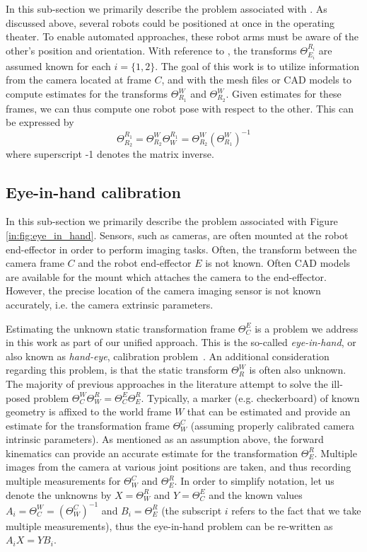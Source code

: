 In this sub-section we primarily describe the problem associated with .
As discussed above, several robots could be positioned at once in the operating theater.
To enable automated approaches, these robot arms must be aware of the other's position and orientation.
With reference to , the transforms $\Theta^{R_i}_{E_i}$ are assumed known for each $i=\{1, 2\}$.
The goal of this work is to utilize information from the camera located at frame $C$, and with the mesh files or CAD models to compute estimates for the transforms $\Theta^W_{R_1}$ and $\Theta^W_{R_2}$.
Given estimates for these frames, we can thus compute one robot pose with respect to the other.
This can be expressed by
\[
\Theta^{R_1}_{R_2} = \Theta^W_{R_2} \Theta^{R_1}_W = \Theta^W_{R_2} (\Theta^W_{R_1})^{-1}
\]
where superscript -1 denotes the matrix inverse. 

\subsection{Eye-in-hand calibration}

In this sub-section we primarily describe the problem associated with Figure \ref{in:fig:eye_in_hand}.
Sensors, such as cameras, are often mounted at the robot end-effector in order to perform imaging tasks.
Often, the transform between the camera frame $C$ and the robot end-effector $E$ is not known.
Often CAD models are available for the mount which attaches the camera to the end-effector.
However, the precise location of the camera imaging sensor is not known accurately, i.e. the camera extrinsic parameters.

Estimating the unknown static transformation frame $\Theta^E_C$ is a problem we address in this work as part of our unified approach.
This is the so-called \textit{eye-in-hand}, or also known as \textit{hand-eye}, calibration problem~\cite{Horaud95}.
An additional consideration regarding this problem, is that the static transform $\Theta^W_R$ is often also unknown.
The majority of previous approaches in the literature attempt to solve the ill-posed problem $\Theta^W_C \Theta^R_W = \Theta^E_C \Theta^R_E$.
Typically, a marker (e.g. checkerboard) of known geometry is affixed to the world frame $W$ that can be estimated and provide an estimate for the transformation frame $\Theta^C_W$ (assuming properly calibrated camera intrinsic parameters).
As mentioned as an assumption above, the forward kinematics can provide an accurate estimate for the transformation $\Theta^R_E$.
Multiple images from the camera at various joint positions are taken, and thus recording multiple measurements for $\Theta^C_W$ and $\Theta^R_E$.
In order to simplify notation, let us denote the unknowns by $X=\Theta^R_W$ and $Y=\Theta^E_C$ and the known values $A_i=\Theta^W_C = (\Theta^C_W)^{-1}$ and $B_i=\Theta^R_E$ (the subscript $i$ refers to the fact that we take multiple measurements), thus the eye-in-hand problem can be re-written as $A_i X = Y B_i$.

